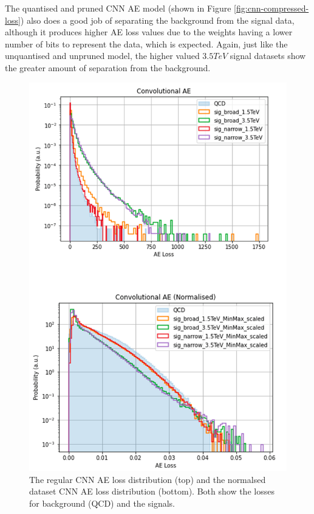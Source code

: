 \documentclass[a4paper]{article}
\theoremstyle{plain}
\theoremstyle{definition}
\begin{document}
			The quantised and pruned CNN AE model (shown in Figure \ref{fig:cnn-compressed-loss}) also does a good job of separating the background from the signal data, although it produces higher AE loss values due to the weights having a lower number of bits to represent the data, which is expected. Again, just like the unquantised and unpruned model, the higher valued $3.5  TeV$ signal datasets show the greater amount of separation from the background. 

			\begin{figure}[H]
				\centering
					\begin{minipage}[c]{0.45\linewidth}
						\centering
						\includegraphics[width=\textwidth]{cnn-loss.png}
						\caption{The regular CNN AE loss distribution (top) and the normalsed dataset CNN AE loss distribution (bottom). Both show the losses for background (QCD) and the signals.}

\end{minipage}
\end{figure}
\end{document}

